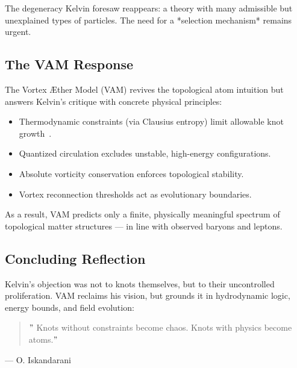    The degeneracy Kelvin foresaw reappears: a theory with many admissible but unexplained types of particles. The need for a *selection mechanism* remains urgent.

   \subsection*{The VAM Response}

   The Vortex Æther Model (VAM) revives the topological atom intuition but answers Kelvin's critique with concrete physical principles:

   \begin{itemize}
     \item Thermodynamic constraints (via Clausius entropy) limit allowable knot growth~\cite{clausius1865entropy}.
     \item Quantized circulation excludes unstable, high-energy configurations.
     \item Absolute vorticity conservation enforces topological stability.
     \item Vortex reconnection thresholds act as evolutionary boundaries.
   \end{itemize}

   As a result, VAM predicts only a finite, physically meaningful spectrum of topological matter structures — in line with observed baryons and leptons.

   \subsection*{Concluding Reflection}

   Kelvin's objection was not to knots themselves, but to their uncontrolled proliferation. VAM reclaims his vision, but grounds it in hydrodynamic logic, energy bounds, and field evolution:

   \begin{quote}
    \("\) Knots without constraints become chaos. Knots with physics become atoms.\("\)
   \end{quote}
  \hfill — O. Iskandarani